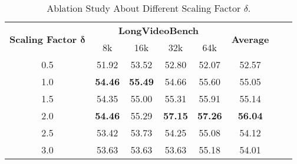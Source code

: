 \begin{table}[!h]
\setlength\tabcolsep{5pt}  %
\centering
\caption{Ablation Study About Different Scaling Factor $\delta$.}
\label{tab:ablation_t_steps}
\vspace{2mm}
\normalsize
\begin{tabular}{cccccccc}
\hline
\multirow{2}{*}{\textbf{Scaling Factor $\boldsymbol{\delta}$}} & \multicolumn{4}{c}{\textbf{LongVideoBench}} & \multirow{2}{*}{\textbf{Average}} \\ 
\cmidrule(lr){2-5} 
 & 8k & 16k & 32k & 64k & \\ \hline
0.5 & 51.92 & 53.52 & 52.80 & 52.07 & 52.57 \\
1.0 & \textbf{54.46} & \textbf{55.49} & 54.66 & 55.60 & 55.05 \\
1.5 & 54.35 & 55.00 & 55.31 & 55.91 & 55.14 \\
\rowcolor[HTML]{F2F3F5} 
2.0 & \textbf{54.46} & 55.29 & \textbf{57.15} & \textbf{57.26} & \textbf{56.04} \\
2.5 & 53.42 & 53.73 & 54.25 & 55.08 & 54.12 \\
3.0 & 53.63 & 53.63 & 53.63 & 55.18 & 54.01 \\ \hline
\end{tabular}
\end{table}
